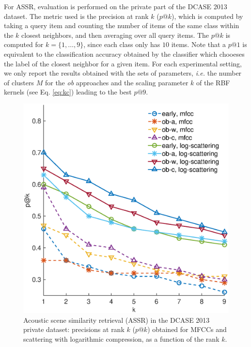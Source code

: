 \documentclass[journal]{IEEEtran}
\newcommand{\ja}[1]{\textcolor{magenta}{Joakim : #1}}
\begin{document}
For ASSR, evaluation is performed on the private part of the DCASE 2013 dataset. The metric used is the precision at rank $k$ ($p@k$), which is computed by taking a query item and counting the number of items of the same class within the $k$ closest neighbors, and then averaging over all query items. The $p@k$ is computed for $k=\lbrace 1,\ldots,9\rbrace$, since each class only has $10$ items. Note that a $p@1$ is equivalent to the classification accuracy obtained by the classifier which chooeses the label of the closest neighbor for a given item. For each experimental setting, we only report the results obtained with the sets of parameters, \emph{i.e.} the number of clusters $M$ for the \emph{ob} approaches and the scaling parameter $k$ of the RBF kernels (see Eq. \ref{eq:kc}) leading to the best $p@9$.



\begin{figure}[t]
\begin{center}
\includegraphics[width=.9\columnwidth]{gfx/unsupervised_test2}
\caption{Acoustic scene similarity retrieval (ASSR) in the DCASE 2013 private dataset: precisions at rank $k$ ($p@k$) obtained for MFCCs and scattering with logarithmic compression, as a function of the rank $k$.}
\label{fig:ASS_1}
\end{center}
\end{figure}
 
\end{document}
